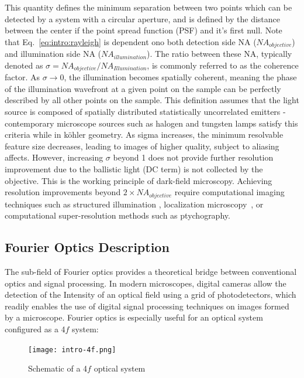 This quantity defines the minimum separation between two points which can be detected by a system with a circular aperture, and is defined by the distance between the center if the point spread function (PSF) and it's first null. Note that Eq.~\ref{eq:intro:rayleigh} is dependent ono both detection side NA ($NA_{objective}$) and illumination side NA ($NA_{illumination}$). The ratio between these NA, typically denoted as $\sigma = NA_{objective}/NA_{Illumination}$, is commonly referred to as the coherence factor. As $\sigma \longrightarrow 0 $, the illumination becomes spatially coherent, meaning the phase of the illumination wavefront at a given point on the sample can be perfectly described by all other points on the sample. This definition assumes that the light source is composed of spatially distributed statistically uncorrelated emitters - contemporary microscope sources such as halogen and tungsten lamps satisfy this criteria while in k{\"o}hler geometry. As sigma increases, the minimum resolvable feature size decreases, leading to images of higher quality, subject to aliasing affects. However, increasing $\sigma$ beyond 1 does not provide further resolution improvement due to the ballistic light (DC term) is not collected by the objective. This is the working principle of dark-field microscopy. Achieving resolution improvements beyond $2\times NA_{objective}$  require computational imaging techniques such as structured illumination \cite{gustafsson2000surpassing}, localization microscopy~\cite{Rust:06, betzig2006imaging}, or computational super-resolution methods such as ptychography\cite{Zheng2013}.

\subsection{Fourier Optics Description}
The sub-field of Fourier optics provides a theoretical bridge between conventional optics and signal processing. In modern microscopes, digital cameras allow the detection of the Intensity of an optical field using a grid of photodetectors, which readily enables the use of digital signal processing techniques on images formed by a microscope. Fourier optics is especially useful for an optical system configured as a 4$f$ system:

\begin{figure}[tbh]
\centering
\texttt{[image: intro-4f.png]}
\caption{\label{fig:4f} Schematic of a 4$f$ optical system}
\end{figure}

